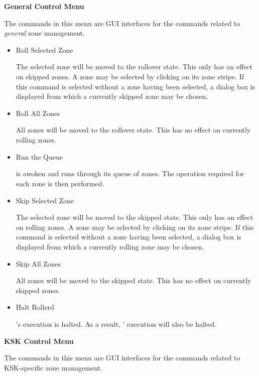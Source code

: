 {\bf General Control Menu}

The commands in this menu are GUI interfaces for the  commands
related to {\it general} zone management.

\begin{itemize}

\item Roll Selected Zone\verb" "

The selected zone will be moved to the rollover state.  This only has an
effect on skipped zones.  A zone may be selected by clicking on its zone
stripe.  If this command is selected without a zone having been selected,
a dialog box is displayed from which a currently skipped zone may be chosen.

\item Roll All Zones\verb" "

All zones will be moved to the rollover state.  This has no effect on
currently rolling zones.

\item Run the Queue\verb" "

 is awoken and runs through its queue of zones.  The operation
required for each zone is then performed.

\item Skip Selected Zone\verb" "

The selected zone will be moved to the skipped state.  This only has an effect
on rolling zones.  A zone may be selected by clicking on its zone stripe.  If
this command is selected without a zone having been selected, a dialog box is
displayed from which a currently rolling zone may be chosen.

\item Skip All Zones\verb" "

All zones will be moved to the skipped state.  This has no effect on
currently skipped zones.

\item Halt Rollerd\verb" "

's execution is halted.  As a result, '
execution will also be halted.

\end{itemize}

{\bf KSK Control Menu}

The commands in this menu are GUI interfaces for the  commands
related to KSK-specific zone management.

